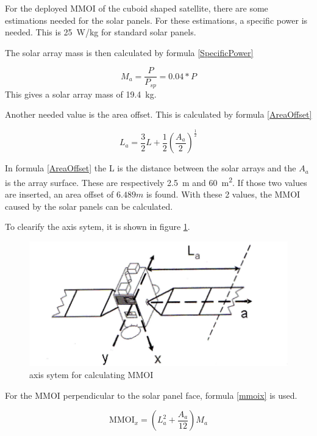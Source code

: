 For the deployed MMOI of the cuboid shaped satellite, there are some
estimations needed for the solar panels. For these estimations, a
specific power is needed. This is \SI{25}{W/kg} for standard solar
panels. \cite{wertz1999space}

The solar array mass is then calculated by formula \ref{SpecificPower}

\begin{equation}
  \label{SpecificPower}
  M_a=\frac{P}{P_{sp}}=0.04*P
\end{equation}
This gives a solar array mass of \SI{19.4}{kg}.

Another needed value is the area offset. This is calculated by formula \ref{AreaOffset}

\begin{equation}
  \label{AreaOffset}
  L_a=\frac{3}{2}L+\frac{1}{2} \left(\frac{A_a}{2} \right)^{\frac{1}{2}}
\end{equation}

In formula \ref{AreaOffset} the L is the distance between the solar
arrays and the $A_a$ is the array surface. These are respectively
\SI{2.5}{m} and \SI{60}{m^2}. If those two values are inserted, an
area offset of $6.489 m$ is found. With these 2 values, the MMOI
caused by the solar panels can be calculated.

To clearify the axis sytem, it is shown in figure
\ref{axissystemcuboid}.

\begin{figure}[H]
  \centering
  \includegraphics[width=\textwidth]{axissystem}
  \caption{axis sytem for calculating MMOI}
  \label{axissystemcuboid}
\end{figure}

For the MMOI perpendicular to the solar panel face, formula
\ref{mmoix} is used.

\begin{equation}
  \label{mmoix}
  \mathrm{MMOI}_x=\left(L_a^2+\frac{A_a}{12}\right)M_a
\end{equation}

